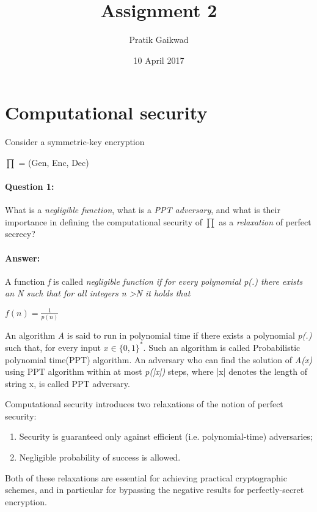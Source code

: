 \documentclass{article}
\title{Assignment 2}
\author{Pratik Gaikwad}
\date{10 April 2017}
\begin{document}
\maketitle

\section{Computational security}
    
    Consider a symmetric-key encryption
    \begin{center}
        $ \prod $ = (Gen, Enc, Dec)
    \end{center}
    
    \paragraph{Question 1:} What is a \emph{negligible function}, what is a \emph{PPT adversary}, and what is their importance in defining the computational security of 
    \begin{math} 
        \prod 
    \end{math} as a \emph{relaxation} of perfect secrecy?
    
    \paragraph{Answer:\newline} 
    
        \begin{flushleft}
            A function \emph{f} is called \emph{negligible function} \emph{if for every polynomial p(.) there exists an N such that for all integers n \textgreater N it holds that}
            \begin{center}
                $
                    f(n) = \frac{1}{p(n)}
                $
            \end{center}
            
            An algorithm \emph{A} is said to run in polynomial time if there exists a polynomial \emph{p(.)} such that, for every input 
                $
                    x\in\{0,1\}^*
                $.
            Such an algorithm is called Probabilistic polynomial time(PPT) algorithm.
            An adversary who can find the solution of \emph{A(x)} using PPT algorithm within at most \emph{p(|x|)} steps, where |x| denotes the length of string x, is called PPT adversary. \newline
            
            Computational security introduces two relaxations of the notion of perfect security:
            \begin{enumerate}
                \item Security is guaranteed only against  efficient (i.e. polynomial-time) adversaries;
                \item Negligible probability of success is allowed.
            \end{enumerate}
            Both of these relaxations are essential for achieving practical cryptographic schemes, and in particular for bypassing the negative results for perfectly-secret encryption.
        \end{flushleft}
    
\end{document}

